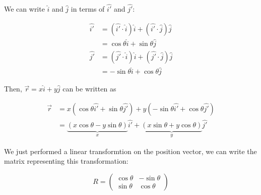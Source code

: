 \documentclass[14pt]{extarticle}
\begin{document}
\begin{center}
\end{center}

We can write $\hat{i}$ and $\hat{j}$ in terms of $\hat{i'}$ and $\hat{j'}$:

\begin{align*}
  \hat{i'} & = \left( \hat{i'} \cdot \hat{i} \right) \hat{i}
  + \left( \hat{i'} \cdot \hat{j} \right) \hat{j}            \\
           & = \cos \theta \hat{i} + \sin \theta \hat{j}     \\
  \hat{j'} & = \left( \hat{j'} \cdot \hat{i} \right) \hat{i}
  + \left( \hat{j'} \cdot \hat{j} \right) \hat{j}            \\
           & = -\sin \theta \hat{i} + \cos \theta \hat{j}
\end{align*}

Then, $\vec{r} = x \hat{i} + y \hat{j}$ can be written as

\begin{align*}
  \vec{r} & = x \left( \cos \theta \hat{i'} + \sin \theta \hat{j'} \right)  + y \left( -\sin \theta \hat{i'} + \cos \theta \hat{j'} \right) \\
          & = \underbrace{ (x \cos \theta - y \sin \theta) }_x \hat{i'}
  + \underbrace{ (x \sin \theta + y \cos \theta) }_y \hat{j'}
\end{align*}

We just performed a linear transformtion on the position vector,
we can write the matrix representing this transformation:

$$
  R = \begin{pmatrix}
    \cos \theta & -\sin \theta \\
    \sin \theta & \cos \theta
  \end{pmatrix}
$$
\end{document}
